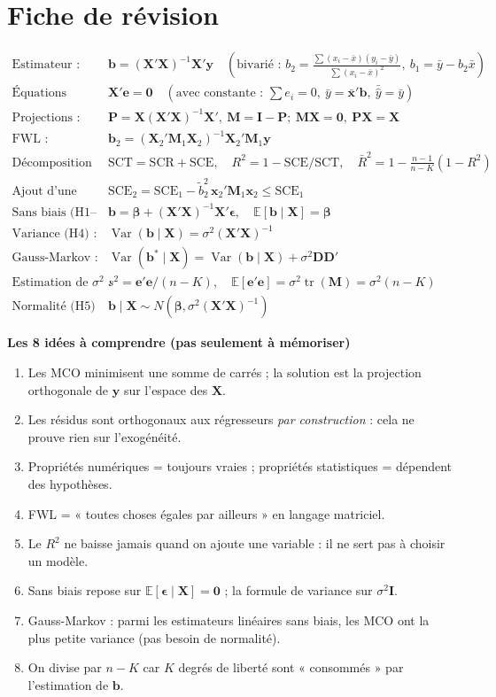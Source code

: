 \documentclass[11pt,a4paper]{article}
\newcommand{\vy}{\mathbf{y}}
\newcommand{\vX}{\mathbf{X}}
\newcommand{\ve}{\mathbf{e}}
\newcommand{\vb}{\mathbf{b}}
\newcommand{\vx}{\mathbf{x}}
\newcommand{\vbeta}{\bm{\beta}}
\newcommand{\veps}{\bm{\epsilon}}
\newcommand{\Mm}{\mathbf{M}}
\newcommand{\Pm}{\mathbf{P}}
\newcommand{\I}{\mathbf{I}}
\newcommand{\D}{\mathbf{D}}
\newcommand{\XtXi}{(\vX'\vX)^{-1}}
\newcommand{\E}{\mathbb{E}}
\newcommand{\Var}{\operatorname{Var}}
\newcommand{\tr}{\operatorname{tr}}
\begin{document}
\section{Fiche de révision}
\begin{tcolorbox}[colback=white,colframe=NavyBlue,title=Les formules essentielles]
\small\begin{align*}
\text{Estimateur :}\ & \vb=\XtXi\vX'\vy \quad(\text{bivarié : } b_2=\tfrac{\sum(x_i-\bar x)(y_i-\bar y)}{\sum(x_i-\bar x)^2},\ b_1=\bar y-b_2\bar x)\\
\text{Équations normales :}\ & \vX'\ve=\mathbf 0\quad(\text{avec constante : }\textstyle\sum e_i=0,\ \bar y=\bar{\vx}'\vb,\ \bar{\hat y}=\bar y)\\
\text{Projections :}\ & \Pm=\vX\XtXi\vX',\ \Mm=\I-\Pm;\ \Mm\vX=\mathbf 0,\ \Pm\vX=\vX\\
\text{FWL :}\ & \vb_2=(\vX_2'\Mm_1\vX_2)^{-1}\vX_2'\Mm_1\vy\\
\text{Décomposition :}\ & \text{SCT}=\text{SCR}+\text{SCE},\quad R^2=1-\text{SCE}/\text{SCT},\quad \bar R^2=1-\tfrac{n-1}{n-K}(1-R^2)\\
\text{Ajout d'une variable :}\ & \text{SCE}_2=\text{SCE}_1-\tilde b_2^2\,\vx_2'\Mm_1\vx_2\le\text{SCE}_1\\
\text{Sans biais (H1--H3) :}\ & \vb=\vbeta+\XtXi\vX'\veps,\quad \E[\vb\mid\vX]=\vbeta\\
\text{Variance (H4) :}\ & \Var(\vb\mid\vX)=\sigma^2\XtXi\\
\text{Gauss-Markov :}\ & \Var(\vb^*\mid\vX)=\Var(\vb\mid\vX)+\sigma^2\D\D'\\
\text{Estimation de }\sigma^2\text{ :}\ & s^2=\ve'\ve/(n-K),\quad \E[\ve'\ve]=\sigma^2\tr(\Mm)=\sigma^2(n-K)\\
\text{Normalité (H5) :}\ & \vb\mid\vX\sim N(\vbeta,\sigma^2\XtXi)
\end{align*}
\end{tcolorbox}

\textbf{Les 8 idées à comprendre (pas seulement à mémoriser)}
\begin{enumerate}[nosep]
\item Les MCO minimisent une somme de carrés ; la solution est la projection orthogonale de $\vy$ sur l'espace des $\vX$.
\item Les résidus sont orthogonaux aux régresseurs \emph{par construction} : cela ne prouve rien sur l'exogénéité.
\item Propriétés numériques = toujours vraies ; propriétés statistiques = dépendent des hypothèses.
\item FWL = « toutes choses égales par ailleurs » en langage matriciel.
\item Le $R^2$ ne baisse jamais quand on ajoute une variable : il ne sert pas à choisir un modèle.
\item Sans biais repose sur $\E[\veps\mid\vX]=\mathbf0$ ; la formule de variance sur $\sigma^2\I$.
\item Gauss-Markov : parmi les estimateurs linéaires sans biais, les MCO ont la plus petite variance (pas besoin de normalité).
\item On divise par $n-K$ car $K$ degrés de liberté sont « consommés » par l'estimation de $\vb$.
\end{enumerate}
\end{document}
